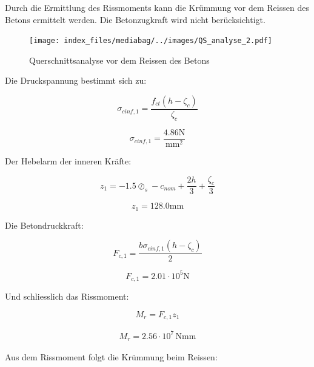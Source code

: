 \documentclass[
  12pt,
  letterpaper,
  egregdoesnotlikesansseriftitles]{scrreprt}
\begin{document}
Durch die Ermittlung des Rissmoments kann die Krümmung vor dem Reissen
des Betons ermittelt werden. Die Betonzugkraft wird nicht
berücksichtigt.

\begin{figure}[H]

{\centering \texttt{[image: index\_files/mediabag/../images/QS\_analyse\_2.pdf]}

}

\caption{\label{fig-qs2}Querschnittsanalyse vor dem Reissen des Betons}

\end{figure}

Die Druckspannung bestimmt sich zu:

\begin{equation}\sigma_{c inf,1} = \frac{f_{ct} \left(h - \zeta_{c}\right)}{\zeta_{c}}\end{equation}

\begin{equation}\sigma_{c inf,1} = \frac{4.86 \text{N}}{\text{mm}^{2}}\end{equation}

Der Hebelarm der inneren Kräfte:

\begin{equation}z_{1} = - 1.5 \oslash_{s} - c_{nom} + \frac{2 h}{3} + \frac{\zeta_{c}}{3}\end{equation}

\begin{equation}z_{1} = 128.0 \text{mm}\end{equation}

Die Betondruckkraft:

\begin{equation}F_{c,1} = \frac{b \sigma_{c inf,1} \left(h - \zeta_{c}\right)}{2}\end{equation}

\begin{equation}F_{c,1} = 2.01 \cdot 10^{5} \text{N}\end{equation}

Und schliesslich das Rissmoment:

\begin{equation}M_{r} = F_{c,1} z_{1}\end{equation}

\begin{align}M_{r} = 2.56 \cdot 10^{7} \, \mathrm{Nmm} \end{align}

Aus dem Rissmoment folgt die Krümmung beim Reissen:
\end{document}
